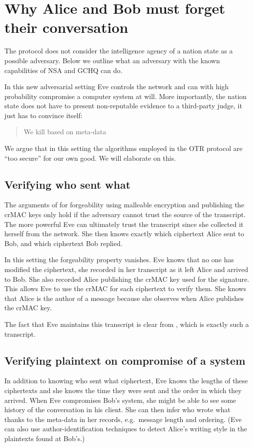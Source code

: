 \section{Why Alice and Bob must forget their conversation}
\label{sec:otrattacks}

The protocol does not consider the intelligence agency of a nation state as 
a possible adversary.
Below we outline what an adversary with the known capabilities of \ac{NSA} and 
\ac{GCHQ} can do.

In this new adversarial setting Eve controls the network and can with high 
probability compromise a computer system at will.
More importantly, the nation state does not have to present non-reputable 
evidence to a third-party judge, it just has to convince itself: 
\blockcquote{metadatakill}{We kill based on meta-data}.
We argue that in this setting the algorithms employed in the \ac{OTR} protocol 
are \enquote{too secure} for our own good.
We will elaborate on this.

\subsection{Verifying who sent what}

The arguments of \citet{otr2004} for forgeability using malleable encryption 
and publishing the \ac{crMAC} keys only hold if the adversary cannot trust the 
source of the transcript.
The more powerful Eve can ultimately trust the transcript since she collected 
it herself from the network.
She then knows exactly which ciphertext Alice sent to Bob, and which ciphertext 
Bob replied.

In this setting the forgeability property vanishes.
Eve knows that no one has modified the ciphertext, she recorded in her 
transcript as it left Alice and arrived to Bob.
She also recorded Alice publishing the \ac{crMAC} key used for the signature.
This allows Eve to use the \ac{crMAC} for each ciphertext to verify them.
She knows that Alice is the author of a message because she observes when Alice 
publishes the \ac{crMAC} key.

The fact that Eve maintains this transcript is clear from \cite{spiegelotr}, 
which is exactly such a transcript.

\subsection{Verifying plaintext on compromise of a system}

In addition to knowing who sent what ciphertext, Eve knows the lengths of these 
ciphertexts and she knows the time they were sent and the order in which they 
arrived.
When Eve compromises Bob's system, she might be able to see some history of the 
conversation in his client.
She can then infer who wrote what thanks to the meta-data in her records, 
e.g.~message length and ordering.
(Eve can also use author-identification techniques to detect Alice's writing 
style in the plaintexts found at Bob's.)

